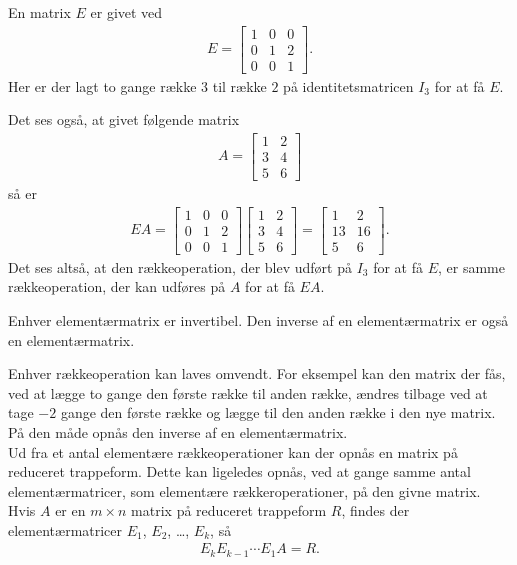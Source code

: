 \begin{eks}
En matrix $E$ er givet ved
\begin{align*}
E =\begin{bmatrix}
1 & 0 & 0 \\
0 & 1 & 2 \\
0 & 0 & 1 
\end{bmatrix}.
\end{align*}
Her er der lagt to gange række $3$ til række $2$ på identitetsmatricen $I_3$ for at få $E$.

Det ses også, at givet følgende matrix
\begin{align*}
A =\begin{bmatrix}
1 & 2 \\
3 & 4 \\
5 & 6 
\end{bmatrix}
\end{align*}
så er
\begin{align*}
EA =\begin{bmatrix}
1 & 0 & 0 \\
0 & 1 & 2 \\
0 & 0 & 1
\end{bmatrix}
\begin{bmatrix}
1 & 2 \\
3 & 4 \\
5 & 6
\end{bmatrix}
=\begin{bmatrix}
1 & 2 \\
13 & 16 \\
5 & 6
\end{bmatrix}.
\end{align*}
Det ses altså, at den rækkeoperation, der blev udført på $I_3$ for at få $E$, er samme rækkeoperation, der kan udføres på $A$ for at få $EA$. 
\end{eks}

\begin{defn}
Enhver elementærmatrix er invertibel. Den inverse af en elementærmatrix er også en elementærmatrix. 
\end{defn}

Enhver rækkeoperation kan laves omvendt. For eksempel kan den matrix der fås, ved at lægge to gange den første række til anden række, ændres tilbage ved at tage $-2$ gange den første række og lægge til den anden række i den nye matrix. På den måde opnås den inverse af en elementærmatrix. \\
Ud fra et antal elementære rækkeoperationer kan der opnås en matrix på reduceret trappeform. Dette kan ligeledes opnås, ved at gange samme antal elementærmatricer, som elementære rækkeroperationer, på den givne matrix. 
Hvis $A$ er en $m \times n$ matrix på reduceret trappeform $R$, findes der elementærmatricer $E_1$, $E_2$, \dots, $E_k$, så 
\begin{align*}
E_k E_{k-1} \dotsm E_1 A = R.
\end{align*}


